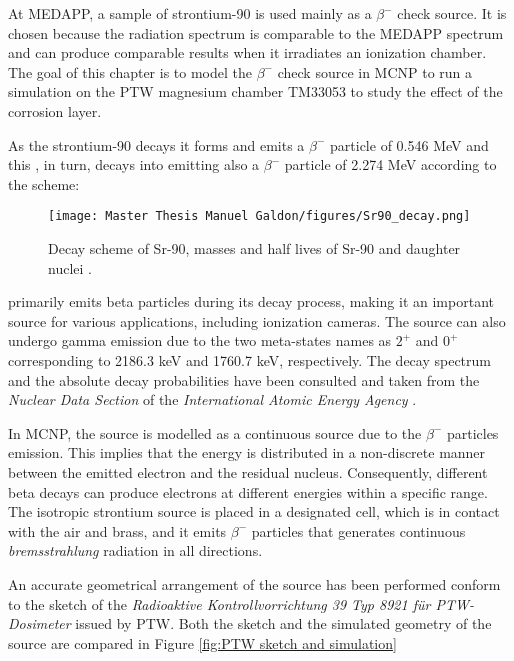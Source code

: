 At MEDAPP, a sample of strontium-90 is used mainly as a $\beta^-$ check source. It is chosen because the radiation spectrum is comparable to the MEDAPP spectrum and can produce comparable results when it irradiates an ionization chamber. The goal of this chapter is to model the $\beta^-$ check source in MCNP to run a simulation on the PTW magnesium chamber TM33053 to study the effect of the corrosion layer.

As the strontium-90 decays it forms  and emits a $\beta ^-$ particle of 0.546 \unit{\mega\electronvolt} \cite{modernlabExperiments} and this , in turn, decays into   emitting also a $\beta ^-$ particle of 2.274 \unit{\mega\electronvolt} \cite{modernlabExperiments} according to the scheme:

\begin{figure}[!h]
    \centering
    \texttt{[image: Master Thesis Manuel Galdon/figures/Sr90\_decay.png]}
    \caption{Decay scheme of Sr-90, masses and half lives of Sr-90 and daughter nuclei \cite{modernlabExperiments}.}
    \label{fig:Sr90_decay}
\end{figure}


 primarily emits beta particles during its decay process, making it an important source for various applications, including ionization cameras. The source can also undergo gamma emission due to the two meta-states names as $2^+$ and $0^+$ corresponding to 2186.3 \unit{\kilo\electronvolt} and 1760.7 \unit{\kilo\electronvolt}, respectively. The decay spectrum and the absolute decay probabilities have been consulted and taken from the \emph{Nuclear Data Section} of the \emph{International Atomic Energy Agency} \cite{intlAtomicEnergy}. 

In MCNP, the source is modelled as a continuous source due to the $\beta^-$ particles emission. This implies that the energy is distributed in a non-discrete manner between the emitted electron and the residual nucleus. Consequently, different beta decays can produce electrons at different energies within a specific range. The isotropic strontium source is placed in a designated cell, which is in contact with the air and brass, and it emits $\beta^-$ particles that generates continuous \textit{bremsstrahlung} radiation in all directions. 

An accurate geometrical arrangement  of the source has been performed conform to the sketch of the \emph{Radioaktive Kontrollvorrichtung 39 Typ 8921 für PTW-Dosimeter} \cite{kontrollvorrichtung} issued by PTW. Both the sketch and the simulated geometry of the source are compared in Figure \ref{fig:PTW sketch and simulation}

